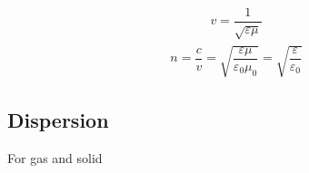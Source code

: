\begin{equation*}
  \begin{aligned}
    v = \dfrac{1}{\sqrt{\varepsilon \mu}} 
  \end{aligned}
\end{equation*}
\begin{equation*}
  \begin{aligned}
    n = \dfrac{c}{v} = \sqrt{\dfrac{\varepsilon \mu}{\varepsilon_0 \mu_0} } = \sqrt{\dfrac{\varepsilon}{\varepsilon_0} }
  \end{aligned}
\end{equation*}

\subsection{Dispersion}

For gas and solid

